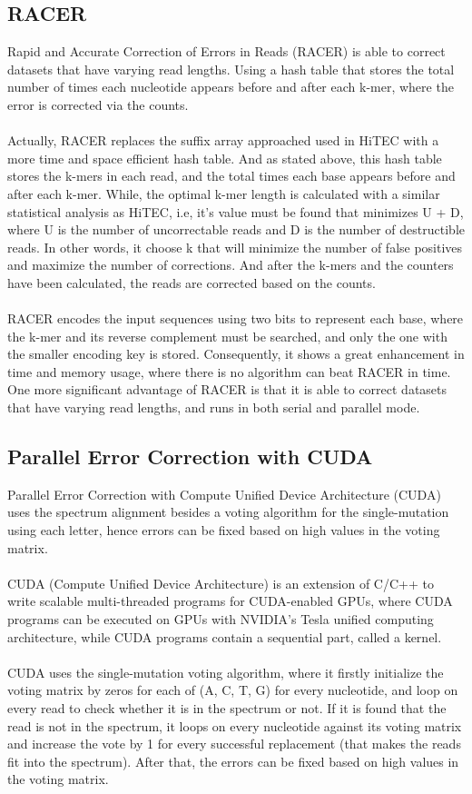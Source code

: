 \documentclass[12pt,openany]{llncs}
\begin{document}
\subsection{RACER}
Rapid and Accurate Correction of Errors in Reads (RACER) \cite{Racer} is able to correct datasets that have varying read lengths. Using a hash table that stores the total number of times each nucleotide appears before and after each k-mer, where the error is corrected via the counts.
\\
\\
Actually, RACER replaces the suffix array approached used in HiTEC with a more time and space efficient hash table. And as stated above, this hash table stores the k-mers in each read, and the total times each base appears before and after each k-mer. While, the optimal k-mer length is calculated with a similar statistical analysis as HiTEC, i.e, it's value must be found that minimizes U + D, where U is the number of uncorrectable reads and D is the number of destructible reads. In other words, it choose k that will minimize the number of false positives and maximize the number of corrections. And after the k-mers and the counters have been calculated, the reads are corrected based on the counts.
\\
\\
RACER encodes the input sequences using two bits to represent each base, where the k-mer and its reverse complement must be searched, and only the one with the smaller encoding key is stored. Consequently, it shows a great enhancement in time and memory usage, where there is no algorithm can beat RACER in time.
\\
One more significant advantage of RACER is that it is able to correct datasets that have varying read lengths, and runs in both serial and parallel mode.
 

\subsection{Parallel Error Correction with CUDA}
Parallel Error Correction with Compute Unified Device Architecture (CUDA) \cite{Cuda} uses the spectrum alignment besides a voting algorithm for the single-mutation using each letter, hence errors can be fixed based on high values in the voting matrix.
\\
\\
CUDA (Compute Unified Device Architecture) is an extension of C/C++ to write scalable multi-threaded programs for CUDA-enabled GPUs, where CUDA programs can be executed on GPUs with NVIDIA’s Tesla unified computing architecture, while CUDA programs contain a sequential part, called a kernel.
\\
\\
CUDA uses the single-mutation voting algorithm, where it firstly initialize the voting matrix by zeros for each of (A, C, T, G) for every nucleotide, and loop on every read to check whether it is in the spectrum or not. If it is found that the read is not in the spectrum, it loops on every nucleotide against its voting matrix and increase the vote by 1 for every successful replacement (that makes the reads fit into the spectrum). After that, the errors can be fixed based on high values in the voting matrix.
\end{document}
